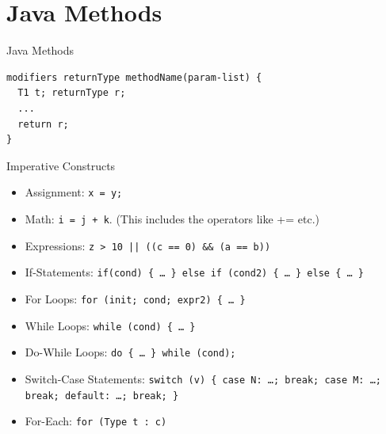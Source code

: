 \documentclass{beamer}
\begin{document}
\section{Java Methods}



\begin{frame}[fragile]{Java Methods}
\begin{verbatim}
modifiers returnType methodName(param-list) {
  T1 t; returnType r;
  ...
  return r;
}
\end{verbatim}
\end{frame}



\begin{frame}{Imperative Constructs}
\begin{itemize}
\item Assignment: {\tt x = y;}
\item Math: {\tt i = j + k}. (This includes the operators like += etc.)
\item Expressions: {\tt z > 10 || ((c == 0) \&\& (a == b))}
\item If-Statements: {\tt if(cond) \{ \ldots~\} else if (cond2) \{ \ldots~\}  else  \{ \ldots~\} }
\item For Loops: {\tt for (init; cond; expr2) \{ \ldots~\} }
\item While Loops: {\tt while (cond) \{ \ldots~\} }
\item Do-While Loops: {\tt do \{ \ldots~\} while (cond); }
\item Switch-Case Statements: {\tt switch (v) \{ case N: \ldots; break; case M: \ldots; break; default: \ldots; break; \} }
\item For-Each: {\tt for (Type t : c)}
\end{itemize}
\end{frame}
\end{document}
